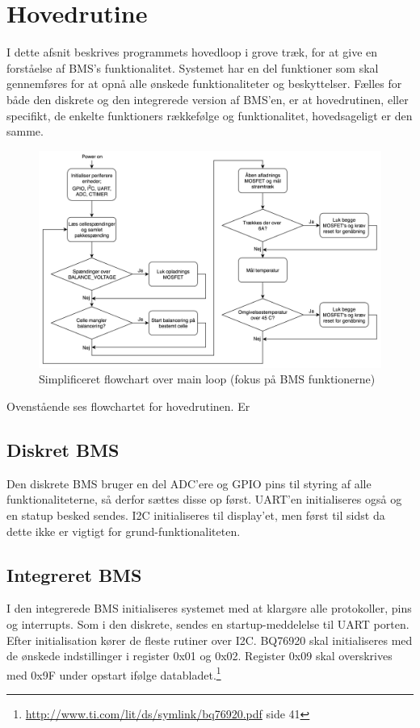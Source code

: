 \section{Hovedrutine}
I dette afsnit beskrives programmets hovedloop i grove træk, for at give en forståelse af BMS's funktionalitet. Systemet har en del funktioner som skal gennemføres for at opnå alle ønskede funktionaliteter og beskyttelser. Fælles for både den diskrete og den integrerede version af BMS'en, er at hovedrutinen, eller specifikt, de enkelte funktioners rækkefølge og funktionalitet, hovedsageligt er den samme. 

\begin{figure}[h]
	\centering
	\includegraphics[width=15cm]{billeder/main_loop_bms_functions.png}
	\caption{Simplificeret flowchart over main loop (fokus på BMS funktionerne)}
	\label{fig:main_loop}
\end{figure}

Ovenstående ses flowchartet for hovedrutinen. Er

\subsection{Diskret BMS}
Den diskrete BMS bruger en del ADC'ere og GPIO pins til styring af alle funktionaliteterne, så derfor sættes disse op først. UART'en initialiseres også og en statup besked sendes. I2C initialiseres til display'et, men først til sidst da dette ikke er vigtigt for grund-funktionaliteten. \\

\subsection{Integreret BMS}
I den integrerede BMS initialiseres systemet med at klargøre alle protokoller, pins og interrupts. Som i den diskrete, sendes en startup-meddelelse til UART porten. Efter initialisation kører de fleste rutiner over I2C. BQ76920 skal initialiseres med de ønskede indstillinger i register 0x01 og 0x02. Register 0x09 skal overskrives med 0x9F under opstart ifølge databladet.\footnote{\url{http://www.ti.com/lit/ds/symlink/bq76920.pdf} side 41} \\